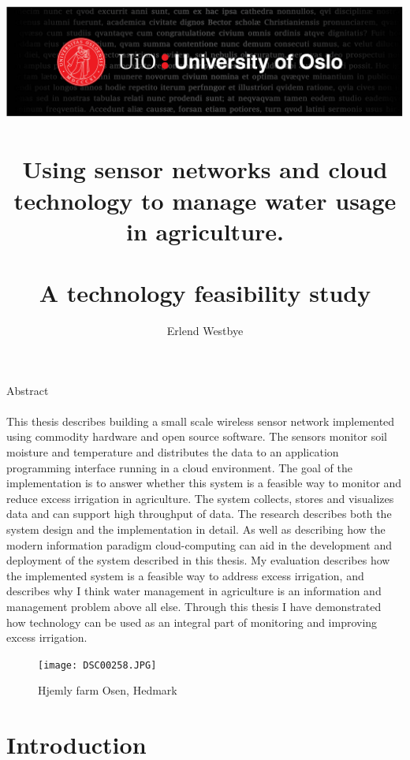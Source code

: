 \documentclass[]{uiophd}
\begin{document}
\title{\includegraphics[scale=0.5]{toppfelt-english.jpg}\\\\
Using sensor networks and cloud technology to manage water usage in agriculture.
\\\\
\large A technology feasibility study}
\author{Erlend Westbye}


\frontmatter
\maketitle
Abstract
\\\\
This thesis describes building a small scale wireless sensor network implemented using commodity hardware and open source software. The sensors monitor soil moisture and temperature and distributes the data to an application programming interface running in a cloud environment. The goal of the implementation is to answer whether this system is a feasible way to monitor and reduce excess irrigation in agriculture. The system collects, stores and visualizes data and can support high throughput of data. The research describes both the system design and the implementation in detail. As well as describing how the modern information paradigm cloud-computing can aid in the development and deployment of the system described in this thesis. My evaluation describes how the implemented system is a feasible way to address excess irrigation, and describes why I think water management in agriculture is an information and management problem above all else. Through this thesis I have demonstrated how technology can be used as an integral part of monitoring and improving excess irrigation.

\begin{figure}[h]
\caption{Hjemly farm Osen, Hedmark}
\centering
\texttt{[image: DSC00258.JPG]}
\end{figure}
\tableofcontents
\linespread{1.3}

\mainmatter


\chapter{Introduction}
\end{document}
